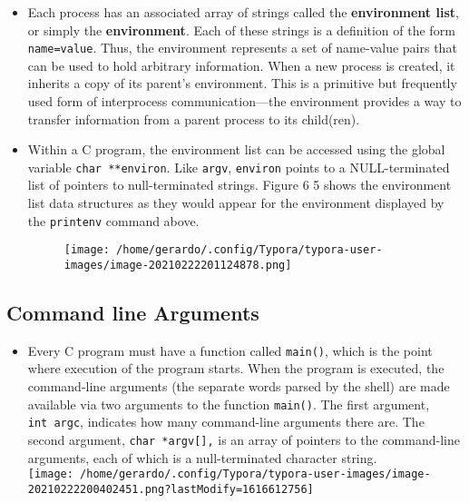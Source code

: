 \documentclass[]{article}
\begin{document}
\begin{itemize}
\item
  Each process has an associated array of strings called the
  \textbf{environment list}, or simply the \textbf{environment}. Each of
  these strings is a definition of the form \texttt{name=value}. Thus,
  the environment represents a set of name-value pairs that can be used
  to hold arbitrary information. When a new process is created, it
  inherits a copy of its parent's environment. This is a primitive but
  frequently used form of interprocess communication---the environment
  provides a way to transfer information from a parent process to its
  child(ren).
\item
  Within a C program, the environment list can be accessed using the
  global variable \texttt{char\ **environ}. Like \texttt{argv},
  \texttt{environ} points to a NULL-terminated list of pointers to
  null-terminated strings. Figure 6 5 shows the environment list data
  structures as they would appear for the environment displayed by the
  \texttt{printenv} command above.

  \begin{figure}
  \centering
  \texttt{[image: /home/gerardo/.config/Typora/typora-user-images/image-20210222201124878.png]}
  \caption{}
  \end{figure}
\end{itemize}

\subsection{\texorpdfstring{\textbf{Command line
Arguments}}{Command line Arguments}}\label{header-n180}

\begin{itemize}
\item
  Every C program must have a function called \texttt{main()}, which is
  the point where execution of the program starts. When the program is
  executed, the command-line arguments (the separate words parsed by the
  shell) are made available via two arguments to the function
  \texttt{main()}. The first argument, \texttt{int\ argc}, indicates how
  many command-line arguments there are. The second argument,
  \texttt{char\ *argv{[}{]},} is an array of pointers to the
  command-line arguments, each of which is a null-terminated character
  string. \\
  \texttt{[image: /home/gerardo/.config/Typora/typora-user-images/image-20210222200402451.png?lastModify=1616612756]}
\end{itemize}
\end{document}
